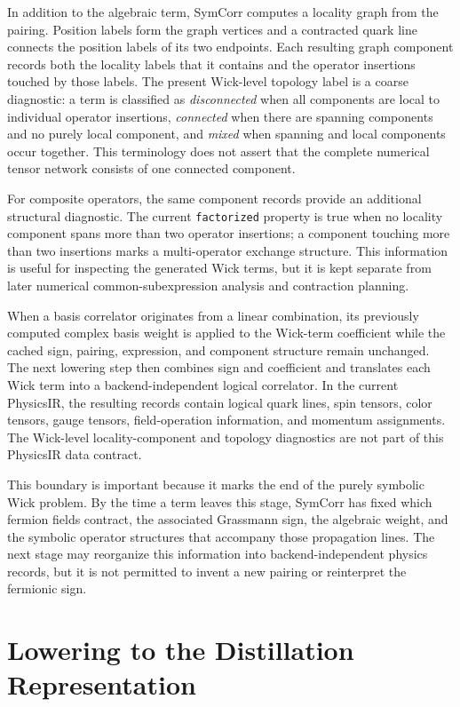 \documentclass[11pt]{article}
\begin{document}
In addition to the algebraic term, SymCorr computes a locality graph from the
pairing. Position labels form the graph vertices and a contracted quark line
connects the position labels of its two endpoints. Each resulting graph
component records both the locality labels that it contains and the operator
insertions touched by those labels. The present Wick-level topology label is a
coarse diagnostic: a term is classified as \emph{disconnected} when all
components are local to individual operator insertions, \emph{connected} when
there are spanning components and no purely local component, and \emph{mixed}
when spanning and local components occur together. This terminology does not
assert that the complete numerical tensor network consists of one connected
component.

For composite operators, the same component records provide an additional
structural diagnostic. The current \texttt{factorized} property is true when no
locality component spans more than two operator insertions; a component touching
more than two insertions marks a multi-operator exchange structure. This
information is useful for inspecting the generated Wick terms, but it is kept
separate from later numerical common-subexpression analysis and contraction
planning.

When a basis correlator originates from a linear combination, its previously
computed complex basis weight is applied to the Wick-term coefficient while the
cached sign, pairing, expression, and component structure remain unchanged. The
next lowering step then combines sign and coefficient and translates each Wick
term into a backend-independent logical correlator. In the current PhysicsIR,
the resulting records contain logical quark lines, spin tensors, color tensors,
gauge tensors, field-operation information, and momentum assignments. The
Wick-level locality-component and topology diagnostics are not part of this
PhysicsIR data contract.

This boundary is important because it marks the end of the purely symbolic Wick
problem. By the time a term leaves this stage, SymCorr has fixed which fermion
fields contract, the associated Grassmann sign, the algebraic weight, and the
symbolic operator structures that accompany those propagation lines. The next
stage may reorganize this information into backend-independent physics records,
but it is not permitted to invent a new pairing or reinterpret the fermionic
sign.

\section{Lowering to the Distillation Representation}
\label{sec:distillation_lowering}
\end{document}
